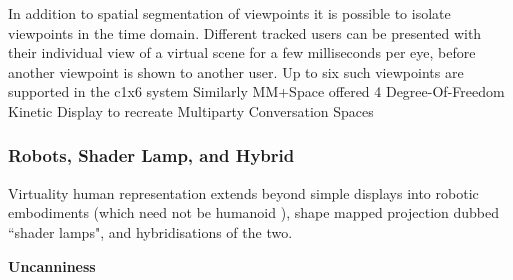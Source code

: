 In addition to spatial segmentation of viewpoints \cite{Gotsch2018} it is possible to isolate viewpoints in the time domain. Different tracked users can be presented with their individual view of a virtual scene for a few milliseconds per eye, before another viewpoint is shown to another user. Up to six such viewpoints are supported in the c1x6 system \cite{Kulik2011}
Similarly MM+Space offered 4 Degree-Of-Freedom Kinetic Display to recreate Multiparty Conversation Spaces \cite{Otsuka2013}
\subsubsection{Robots, Shader Lamp, and Hybrid}
                Virtuality human representation extends beyond simple displays into robotic embodiments (which need not be humanoid \cite{Marti2005}), shape mapped projection dubbed ``shader lamps", and hybridisations of the two.\par 
                
				\textbf{Uncanniness}
				
